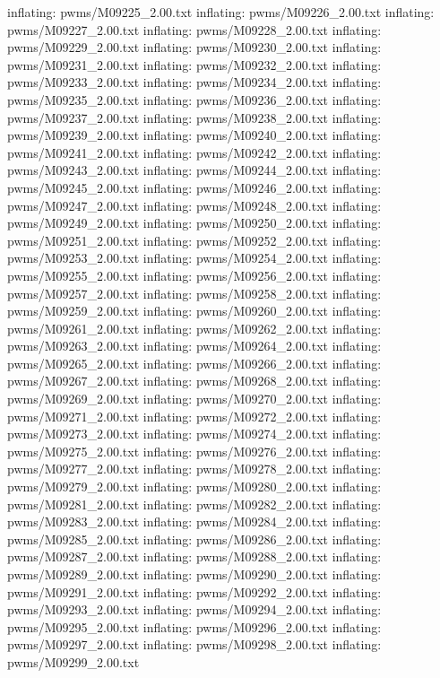 \documentclass[letterpaper,10pt,english]{sphinxmanual}
\begin{document}
{\begin{sphinxVerbatim}[commandchars=\\\{\}]
  inflating: pwms/M09225\_2.00.txt
  inflating: pwms/M09226\_2.00.txt
  inflating: pwms/M09227\_2.00.txt
  inflating: pwms/M09228\_2.00.txt
  inflating: pwms/M09229\_2.00.txt
  inflating: pwms/M09230\_2.00.txt
  inflating: pwms/M09231\_2.00.txt
  inflating: pwms/M09232\_2.00.txt
  inflating: pwms/M09233\_2.00.txt
  inflating: pwms/M09234\_2.00.txt
  inflating: pwms/M09235\_2.00.txt
  inflating: pwms/M09236\_2.00.txt
  inflating: pwms/M09237\_2.00.txt
  inflating: pwms/M09238\_2.00.txt
  inflating: pwms/M09239\_2.00.txt
  inflating: pwms/M09240\_2.00.txt
  inflating: pwms/M09241\_2.00.txt
  inflating: pwms/M09242\_2.00.txt
  inflating: pwms/M09243\_2.00.txt
  inflating: pwms/M09244\_2.00.txt
  inflating: pwms/M09245\_2.00.txt
  inflating: pwms/M09246\_2.00.txt
  inflating: pwms/M09247\_2.00.txt
  inflating: pwms/M09248\_2.00.txt
  inflating: pwms/M09249\_2.00.txt
  inflating: pwms/M09250\_2.00.txt
  inflating: pwms/M09251\_2.00.txt
  inflating: pwms/M09252\_2.00.txt
  inflating: pwms/M09253\_2.00.txt
  inflating: pwms/M09254\_2.00.txt
  inflating: pwms/M09255\_2.00.txt
  inflating: pwms/M09256\_2.00.txt
  inflating: pwms/M09257\_2.00.txt
  inflating: pwms/M09258\_2.00.txt
  inflating: pwms/M09259\_2.00.txt
  inflating: pwms/M09260\_2.00.txt
  inflating: pwms/M09261\_2.00.txt
  inflating: pwms/M09262\_2.00.txt
  inflating: pwms/M09263\_2.00.txt
  inflating: pwms/M09264\_2.00.txt
  inflating: pwms/M09265\_2.00.txt
  inflating: pwms/M09266\_2.00.txt
  inflating: pwms/M09267\_2.00.txt
  inflating: pwms/M09268\_2.00.txt
  inflating: pwms/M09269\_2.00.txt
  inflating: pwms/M09270\_2.00.txt
  inflating: pwms/M09271\_2.00.txt
  inflating: pwms/M09272\_2.00.txt
  inflating: pwms/M09273\_2.00.txt
  inflating: pwms/M09274\_2.00.txt
  inflating: pwms/M09275\_2.00.txt
  inflating: pwms/M09276\_2.00.txt
  inflating: pwms/M09277\_2.00.txt
  inflating: pwms/M09278\_2.00.txt
  inflating: pwms/M09279\_2.00.txt
  inflating: pwms/M09280\_2.00.txt
  inflating: pwms/M09281\_2.00.txt
  inflating: pwms/M09282\_2.00.txt
  inflating: pwms/M09283\_2.00.txt
  inflating: pwms/M09284\_2.00.txt
  inflating: pwms/M09285\_2.00.txt
  inflating: pwms/M09286\_2.00.txt
  inflating: pwms/M09287\_2.00.txt
  inflating: pwms/M09288\_2.00.txt
  inflating: pwms/M09289\_2.00.txt
  inflating: pwms/M09290\_2.00.txt
  inflating: pwms/M09291\_2.00.txt
  inflating: pwms/M09292\_2.00.txt
  inflating: pwms/M09293\_2.00.txt
  inflating: pwms/M09294\_2.00.txt
  inflating: pwms/M09295\_2.00.txt
  inflating: pwms/M09296\_2.00.txt
  inflating: pwms/M09297\_2.00.txt
  inflating: pwms/M09298\_2.00.txt
  inflating: pwms/M09299\_2.00.txt

\end{sphinxVerbatim}}
\end{document}
